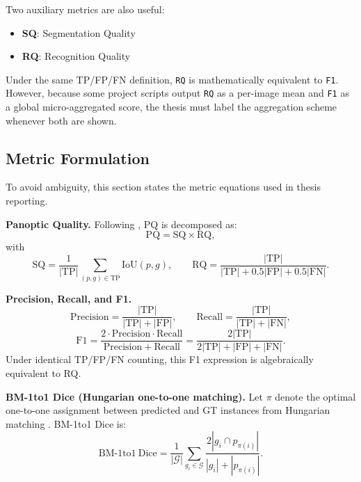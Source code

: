 Two auxiliary metrics are also useful:

\begin{itemize}
\tightlist
\item
  \textbf{SQ}: Segmentation Quality
\item
  \textbf{RQ}: Recognition Quality
\end{itemize}

Under the same TP/FP/FN definition, \texttt{RQ} is mathematically equivalent to \texttt{F1}. However, because some project scripts output \texttt{RQ} as a per-image mean and \texttt{F1} as a global micro-aggregated score, the thesis must label the aggregation scheme whenever both are shown.

\subsection{Metric Formulation}\label{metric-formulation}

To avoid ambiguity, this section states the metric equations used in thesis reporting.

\textbf{Panoptic Quality.}
Following \cite{kirillov2019pq}, PQ is decomposed as:
\begin{equation}
\mathrm{PQ} = \mathrm{SQ} \times \mathrm{RQ},
\end{equation}
with
\begin{equation}
\mathrm{SQ} = \frac{1}{|\mathrm{TP}|}\sum_{(p,g)\in \mathrm{TP}} \mathrm{IoU}(p,g), \qquad
\mathrm{RQ} = \frac{|\mathrm{TP}|}{|\mathrm{TP}| + 0.5|\mathrm{FP}| + 0.5|\mathrm{FN}|}.
\end{equation}

\textbf{Precision, Recall, and F1.}
\begin{equation}
\mathrm{Precision} = \frac{|\mathrm{TP}|}{|\mathrm{TP}| + |\mathrm{FP}|}, \qquad
\mathrm{Recall} = \frac{|\mathrm{TP}|}{|\mathrm{TP}| + |\mathrm{FN}|},
\end{equation}
\begin{equation}
\mathrm{F1} = \frac{2 \cdot \mathrm{Precision}\cdot \mathrm{Recall}}{\mathrm{Precision} + \mathrm{Recall}}
= \frac{2|\mathrm{TP}|}{2|\mathrm{TP}| + |\mathrm{FP}| + |\mathrm{FN}|}.
\end{equation}
Under identical TP/FP/FN counting, this F1 expression is algebraically equivalent to RQ.

\textbf{BM-1to1 Dice (Hungarian one-to-one matching).}
Let $\pi$ denote the optimal one-to-one assignment between predicted and GT instances from Hungarian matching \cite{kuhn1955hungarian}. BM-1to1 Dice is:
\begin{equation}
\mathrm{BM\mbox{-}1to1\ Dice}
= \frac{1}{|\mathcal{G}|}\sum_{g_i \in \mathcal{G}}
\frac{2|g_i \cap p_{\pi(i)}|}{|g_i| + |p_{\pi(i)}|}.
\end{equation}


